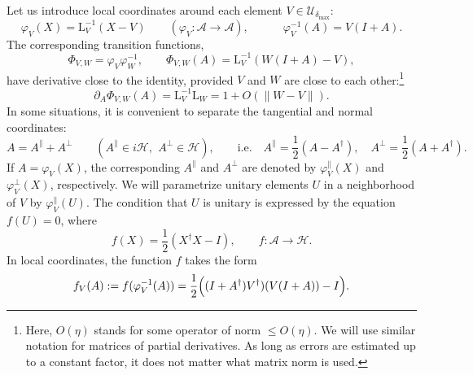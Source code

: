 \documentclass[12pt]{article}
\newcommand{\calA}{\mathcal{A}}
\newcommand{\calH}{\mathcal{H}}
\newcommand{\calU}{\mathcal{U}}
\newcommand{\bydef}{:=}
\newcommand{\La}{\mathrm{L}}
\newcommand{\ph}{\varphi}
\renewcommand{\le}{\leqslant}
\newtheorem[definition]{Definition}[Theorem]{Definition}
\newtheorem[remark]{Example}[Theorem]{Example}
\newtheorem[remark]{Remark}[Theorem]{Remark}
\newtheorem[remark]{Question}[Theorem]{Open question}
\newtheorem*[definition]{definition}{Definition}
\newtheorem*[remark]{example}{Example}
\newtheorem*[remark]{remark}{Remark}
\newtheorem*[remark]{question}{Open question}
\numberwithin{equation}{section}
\begin{document}
Let us introduce local coordinates around each element $V\in\calU_{\delta_{\max}}$:
\begin{equation}
\ph_V(X)=\La_V^{-1}(X-V)\qquad (\ph_V\colon \calA\to\calA),\qquad\quad
\ph_V^{-1}(A)=V(I+A).
\end{equation}
The corresponding transition functions,
\begin{equation}
\Phi_{V,W}=\ph_{V}\ph_{W}^{-1},\qquad
\Phi_{V,W}(A)=\La_V^{-1}(W(I+A)-V),
\end{equation}
have derivative close to the identity, provided $V$ and $W$ are close to each other:\footnote{Here, $O(\eta)$ stands for some operator of norm $\le O(\eta)$. We will use similar notation for matrices of partial derivatives. As long as errors are estimated up to a constant factor, it does not matter what matrix norm is used.}
\begin{equation}
\partial_A\Phi_{V,W}(A)=\La_V^{-1}\La_W=1+O(\|W-V\|).
\end{equation}
In some situations, it is convenient to separate the tangential and normal  coordinates:
\begin{equation}
A=A^\parallel+A^\perp\qquad(A^\parallel\in i\calH,\:\,A^\perp\in\calH),\qquad
\text{i.e.}\quad
A^\parallel=\frac{1}{2}(A-A^\dag),\quad A^\perp=\frac{1}{2}(A+A^\dag).
\end{equation}
If $A=\ph_V(X)$, the corresponding $A^\parallel$ and $A^\perp$ are denoted by $\ph_V^\parallel(X)$ and $\ph_V^\perp(X)$, respectively. We will parametrize unitary elements $U$ in a neighborhood of $V$ by $\ph_V^\parallel(U)$. The condition that $U$ is unitary is expressed by the equation $f(U)=0$, where
\begin{equation}
f(X)=\frac{1}{2}(X^{\dag}X-I),\qquad f\colon \calA\to\calH.
\end{equation}
In local coordinates, the function $f$ takes the form
\begin{equation}
f_V(A)\bydef f(\ph_V^{-1}(A))
=\frac{1}{2}\Bigl((I+A^\dag)V^\dag)(V(I+A))-I\Bigr).
\end{equation}
\end{document}
